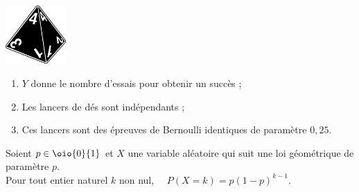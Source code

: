 \documentclass[a4paper,11pt,cours]{nsi} %
\begin{document}
\begin{exemple}[]
        {\includegraphics[width=2.3cm]{d4-die-7321725_640.png}}
        \begin{enumerate}[label=\textbullet]
            \item $Y$ donne le nombre d'essais pour obtenir un succès ;
            \item Les lancers de dés sont indépendants ;
            \item Ces lancers sont des épreuves de Bernoulli identiques de paramètre $0,25$.
        \end{enumerate}
\end{exemple}


\begin{propriete}[]
    Soient $p\in\oio{0}{1}$ et $X$ une variable aléatoire qui suit une loi géométrique de paramètre $p$.\\
    Pour tout entier naturel $k$ non nul, $\quad P(X=k)=p(1-p)^{k-1}$.
\end{propriete}
\end{document}
